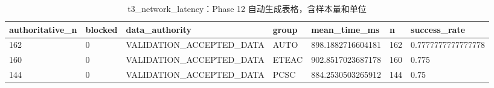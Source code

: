 \begin{table}[htbp]
\centering
\caption{t3_network_latency：Phase 12 自动生成表格，含样本量和单位}
\begin{tabular}{lllllll}
\hline
authoritative_n & blocked & data_authority & group & mean_time_ms & n & success_rate \\
\hline
162 & 0 & VALIDATION\_ACCEPTED\_DATA & AUTO & 898.1882716604181 & 162 & 0.7777777777777778 \\
160 & 0 & VALIDATION\_ACCEPTED\_DATA & ETEAC & 902.8517023687178 & 160 & 0.775 \\
144 & 0 & VALIDATION\_ACCEPTED\_DATA & PCSC & 884.2530503265912 & 144 & 0.75 \\
\hline
\end{tabular}
\end{table}
